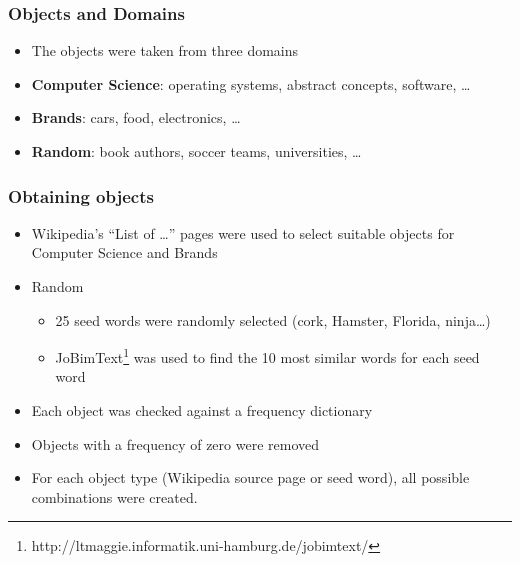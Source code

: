 \documentclass[11pt,aspectratio=169,usenames,dvipsnames]{beamer}
\begin{document}
    \begin{frame}[t]
        \frametitle{Objects and Domains}
        \begin{itemize}
            \item The objects were taken from three domains
            \item \textbf{Computer Science}: operating systems, abstract concepts, software, \ldots
            \item \textbf{Brands}: cars, food, electronics, \ldots
            \item \textbf{Random}: book authors, soccer teams, universities, \ldots

        \end{itemize}
    \end{frame}

    \begin{frame}[t]
        \frametitle{Obtaining objects}
        \begin{itemize}
            \item Wikipedia's \enquote{List of \ldots} pages were used to select suitable objects for Computer Science and Brands\pause
            \item Random
            \begin{itemize}
                \item 25 seed words were randomly selected (cork, Hamster, Florida, ninja\ldots)
                \item JoBimText\footnote{http://ltmaggie.informatik.uni-hamburg.de/jobimtext/} was used to find the 10 most similar words for each seed word
            \end{itemize}\pause
            \item Each object was checked against a frequency dictionary
            \item Objects with a frequency of zero were removed
            \item For each object type (Wikipedia source page or seed word), all possible combinations were created.
        \end{itemize}

    \end{frame}
\end{document}

